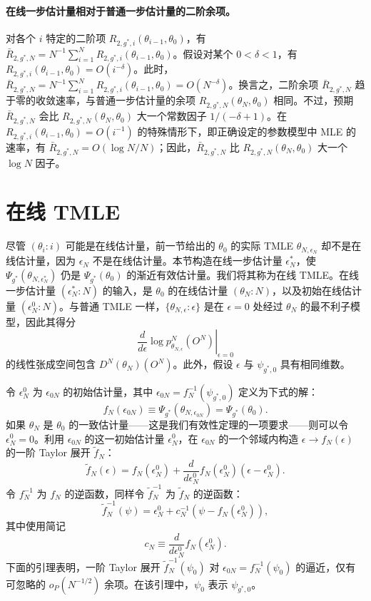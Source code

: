 \paragraph{在线一步估计量相对于普通一步估计量的二阶余项。}
对各个 $i$ 特定的二阶项 $R_{2,g^*,i}(\theta_{i-1},\theta_0)$，有 $\bar R_{2,g^*,N}=N^{-1}\sum_{i=1}^N R_{2,g^*,i}(\theta_{i-1},\theta_0)$。假设对某个 $0<\delta<1$，有 $R_{2,g^*,i}(\theta_{i-1},\theta_0)=O(i^{-\delta})$。此时，$\bar R_{2,g^*,N}=N^{-1}\sum_{i=1}^N R_{2,g^*,i}(\theta_{i-1},\theta_0)=O(N^{-\delta})$。换言之，二阶余项 $\bar R_{2,g^*,N}$ 趋于零的收敛速率，与普通一步估计量的余项 $R_{2,g^*,N}(\theta_N,\theta_0)$ 相同。不过，预期 $\bar R_{2,g^*,N}$ 会比 $R_{2,g^*,N}(\theta_N,\theta_0)$ 大一个常数因子 $1/(-\delta+1)$。在 $R_{2,g^*,i}(\theta_{i-1},\theta_0)=O(i^{-1})$ 的特殊情形下，即正确设定的参数模型中 MLE 的速率，有 $\bar R_{2,g^*,N}=O(\log N/N)$；因此，$\bar R_{2,g^*,N}$ 比 $R_{2,g^*,N}(\theta_N,\theta_0)$ 大一个 $\log N$ 因子。

\section{在线 TMLE}

尽管 $(\theta_i:i)$ 可能是在线估计量，前一节给出的 $\theta_0$ 的实际 TMLE $\theta_{N,\epsilon_N}$ 却不是在线估计量，因为 $\epsilon_N$ 不是在线估计量。本节构造在线一步估计量 $\epsilon_N^*$，使 $\Psi_{g^*}(\theta_{N,\epsilon_N^*})$ 仍是 $\Psi_{g^*}(\theta_0)$ 的渐近有效估计量。我们将其称为在线 TMLE。在线一步估计量 $(\epsilon_N^*:N)$ 的输入，是 $\theta_0$ 的在线估计量 $(\theta_N:N)$，以及初始在线估计量 $(\epsilon_N^0:N)$。与普通 TMLE 一样，$\{\theta_{N,\epsilon}:\epsilon\}$ 是在 $\epsilon=0$ 处经过 $\theta_N$ 的最不利子模型，因此其得分
\[
 \left.\frac d{d\epsilon}\log p^N_{\theta_{N,\epsilon}}(O^N)\right|_{\epsilon=0}
\]
的线性张成空间包含 $D^N(\theta_N)(O^N)$。此外，假设 $\epsilon$ 与 $\psi_{g^*,0}$ 具有相同维数。

令 $\epsilon_N^0$ 为 $\epsilon_{0N}$ 的初始估计量，其中 $\epsilon_{0N}=f_N^{-1}(\psi_{g^*,0})$ 定义为下式的解：
\[
 f_N(\epsilon_{0N})\equiv\Psi_{g^*}(\theta_{N,\epsilon_{0N}})=\Psi_{g^*}(\theta_0).
\]
如果 $\theta_N$ 是 $\theta_0$ 的一致估计量——这是我们有效性定理的一项要求——则可以令 $\epsilon_N^0=0$。利用 $\epsilon_{0N}$ 的这一初始估计量 $\epsilon_N^0$，在 $\epsilon_{0N}$ 的一个邻域内构造 $\epsilon\to f_N(\epsilon)$ 的一阶 Taylor 展开 $\tilde f_N$：
\[
 \tilde f_N(\epsilon)=f_N(\epsilon_N^0)
 +\frac d{d\epsilon_N^0}f_N(\epsilon_N^0)(\epsilon-\epsilon_N^0).
\]
令 $f_N^{-1}$ 为 $f_N$ 的逆函数，同样令 $\tilde f_N^{-1}$ 为 $\tilde f_N$ 的逆函数：
\[
 \tilde f_N^{-1}(\psi)=\epsilon_N^0+c_N^{-1}(\psi-f_N(\epsilon_N^0)),
\]
其中使用简记
\[
 c_N\equiv\frac d{d\epsilon_N^0}f_N(\epsilon_N^0).
\]
下面的引理表明，一阶 Taylor 展开 $\tilde f_N^{-1}(\psi_0)$ 对 $\epsilon_{0N}=f_N^{-1}(\psi_0)$ 的逼近，仅有可忽略的 $o_P(N^{-1/2})$ 余项。在该引理中，$\psi_0$ 表示 $\psi_{g^*,0}$。

